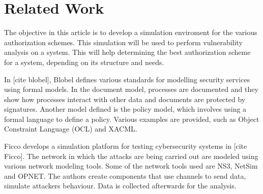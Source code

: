 \documentclass[11pt]{article} %
\begin{document}
\section{Related Work}

The objective in this article is to develop a simulation enviroment for the various authorization schemes. 
This simulation will be used to perform vulnerability analysis on a system. 
This will help determining the best authorization scheme for a system, depending on its structure and needs.

In [cite blobel], Blobel defines various standards for modelling security services using formal models. 
In the document model, processes are documented and they show how processes interact with other data and documents are protected by signatures. 
Another model defined is the policy model, which involves using a formal language to define a policy. 
Various examples are provided, such as Object Constraint Language (OCL) and XACML.

Ficco develops a simulation platform for testing cybersecurity systems in [cite Ficco]. 
The network in which the attacks are being carried out are modeled using various network modeling tools. 
Some of the network tools used are NS3, NetSim and OPNET. 
The authors create components that use channels to send data, simulate attackers behaviour. 
Data is collected afterwards for the analysis.
\end{document}
